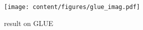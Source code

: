 \begin{figure}
  \centering
  \texttt{[image: content/figures/glue\_imag.pdf]}

  \caption{result on GLUE}
  \label{fig:glue_res}
\end{figure}
